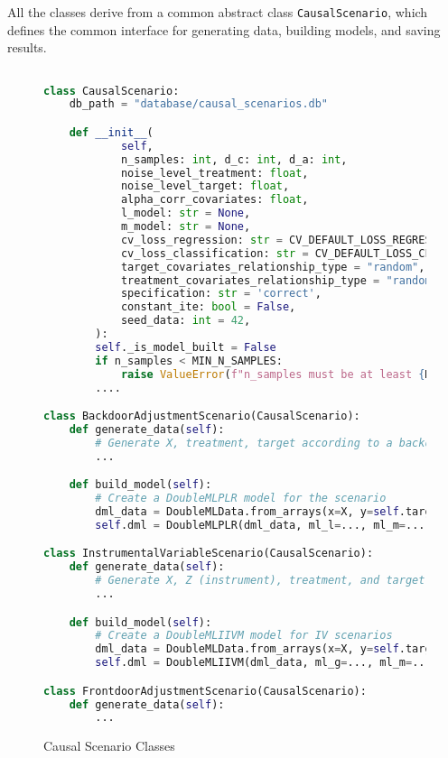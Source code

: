\documentclass{article}
\numberwithin{equation}{section}
\begin{document}
All the classes derive from a common abstract class \texttt{CausalScenario}, which defines the common interface for generating data, building models, and saving results.

\begin{figure}[H]
\begin{lstlisting}[language=python]

class CausalScenario:
    db_path = "database/causal_scenarios.db"

    def __init__(
            self,
            n_samples: int, d_c: int, d_a: int,
            noise_level_treatment: float,
            noise_level_target: float,
            alpha_corr_covariates: float,
            l_model: str = None,
            m_model: str = None,
            cv_loss_regression: str = CV_DEFAULT_LOSS_REGRESSION,
            cv_loss_classification: str = CV_DEFAULT_LOSS_CLASSIFICATION,
            target_covariates_relationship_type = "random",
            treatment_covariates_relationship_type = "random",
            specification: str = 'correct',
            constant_ite: bool = False,
            seed_data: int = 42,
        ):
        self._is_model_built = False
        if n_samples < MIN_N_SAMPLES:
            raise ValueError(f"n_samples must be at least {MIN_N_SAMPLES}")
        ....

class BackdoorAdjustmentScenario(CausalScenario):
    def generate_data(self):
        # Generate X, treatment, target according to a backdoor setup
        ...

    def build_model(self):
        # Create a DoubleMLPLR model for the scenario
        dml_data = DoubleMLData.from_arrays(x=X, y=self.target, d=self.treatment)
        self.dml = DoubleMLPLR(dml_data, ml_l=..., ml_m=..., n_folds=5)

class InstrumentalVariableScenario(CausalScenario):
    def generate_data(self):
        # Generate X, Z (instrument), treatment, and target for IV setup
        ...

    def build_model(self):
        # Create a DoubleMLIIVM model for IV scenarios
        dml_data = DoubleMLData.from_arrays(x=X, y=self.target, d=self.treatment, z=self.Z)
        self.dml = DoubleMLIIVM(dml_data, ml_g=..., ml_m=..., ml_r=..., n_folds=5)

class FrontdoorAdjustmentScenario(CausalScenario):
    def generate_data(self):
        ...
\end{lstlisting}
\caption{Causal Scenario Classes}
\end{figure}
\end{document}
